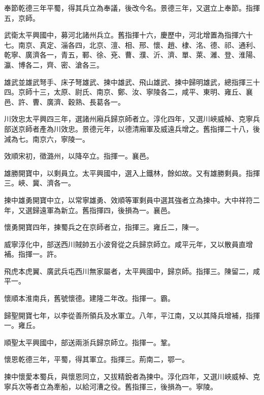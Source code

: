 \begin{pinyinscope}
 奉節乾德三年平蜀，得其兵立為奉議，後改今名。景德三年，又選立上奉節。指揮五，京師。



 武衛太平興國中，募河北諸州兵立。舊指揮十六，慶歷中，河北增置為指揮六十七。南京、真定、淄各四，北京、澶、相、邢、懷、趙、棣、洺、德、祁、通利、乾寧、廣濟各一，青五，鄆、徐、兗、曹、濮、沂、濟、單、萊、濰、登、淮陽、瀛、博各二，齊、密、滄各三。



 雄武並雄武弩手、床子弩雄武、揀中雄武、飛山雄武、揀中歸明雄武，總指揮三十四。京師十三，太原、尉氏、南京、鄭、汝、寧陵各二，咸平、東明、雍丘、襄邑、許、曹、廣濟、穀熟、長葛各一。



 川效忠太平興四三年，選諸州廂兵歸京師者立。淳化四年，又選川峽威棹、克寧兵部送京師者產為川效忠。景德元年，以德清廂軍及威遠兵增之。舊指揮二十八，後減為七。南京六，寧陵一。



 效順宋初，徵潞州，以降卒立。指揮一。襄邑。



 雄勝開寶中，以剩員立。太平興國中，選入上鐵林，餘如故。又有雄勝剩員。指揮
 三。峽、冀、濟各一。



 揀中雄勇開寶中立，以常寧雄勇、效順等軍剩員中選其強者立為揀中。大中祥符二年，又選歸遠軍為新立。舊指揮四，後損為一。襄邑。



 懷勇開寶四年，揀蜀兵之在京師者立，指揮三。雍丘二，陳一。



 威寧淳化中，部送西川賊帥五小波脅從之兵歸京師立。咸平元年，又以散員直增補。指揮一。許。



 飛虎本虎翼、廣武兵屯西川無家屬者，太平興國中，歸京師。指揮三。陳留二，咸平一。



 懷順本淮南兵，舊號懷德。建隆二年改。指揮一。霸。



 歸聖開寶七年，以李從善所領兵及水軍立。八年，平江南，又以其降兵增補，指揮一。雍丘。



 順聖太平興國中，部送兩浙兵歸京師立。指揮一。鞏。



 懷恩乾德三年，平蜀，得其軍立。指揮三。荊南二，鄂一。



 揀中懷愛本蜀兵，與懷恩同立，又拔精銳者為揀中。淳化四年，又選川峽威棹、克寧兵次等者立為牽船，以給河漕之役。舊指揮三，後損為一。寧陵。




\end{pinyinscope}
